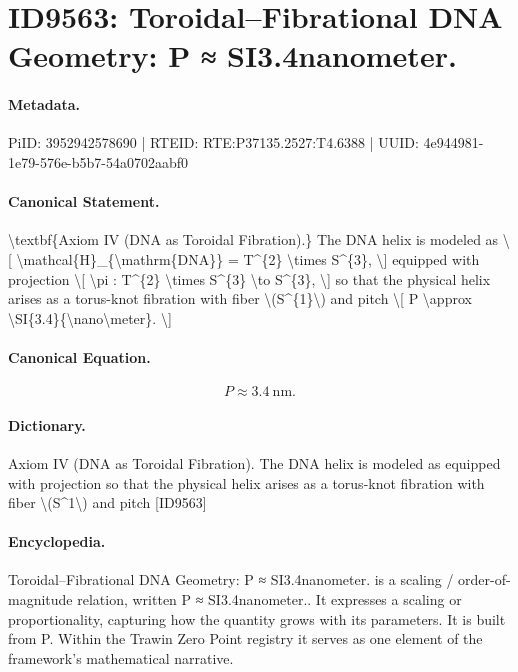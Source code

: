 \section*{ID9563: Toroidal–Fibrational DNA Geometry: P ≈ SI3.4nanometer.}
\paragraph{Metadata.}
PiID: 3952942578690 | RTEID: RTE:P37135.2527:T4.6388 | UUID: 4e944981-1e79-576e-b5b7-54a0702aabf0

\paragraph{Canonical Statement.}
\textbackslash{}textbf\{Axiom IV (DNA as Toroidal Fibration).\} The DNA helix is modeled as \textbackslash{}[ \textbackslash{}mathcal\{H\}\_\{\textbackslash{}mathrm\{DNA\}\} = T\textasciicircum{}\{2\} \textbackslash{}times S\textasciicircum{}\{3\}, \textbackslash{}] equipped with projection \textbackslash{}[ \textbackslash{}pi : T\textasciicircum{}\{2\} \textbackslash{}times S\textasciicircum{}\{3\} \textbackslash{}to S\textasciicircum{}\{3\}, \textbackslash{}] so that the physical helix arises as a torus-knot fibration with fiber \textbackslash{}(S\textasciicircum{}\{1\}\textbackslash{}) and pitch \textbackslash{}[ P \textbackslash{}approx \textbackslash{}SI\{3.4\}\{\textbackslash{}nano\textbackslash{}meter\}. \textbackslash{}]

\paragraph{Canonical Equation.}
\[
P \approx \SI{3.4}{\nano\meter}.
\]

\paragraph{Dictionary.}
Axiom IV (DNA as Toroidal Fibration). The DNA helix is modeled as equipped with projection so that the physical helix arises as a torus-knot fibration with fiber \textbackslash{}(S\textasciicircum{}1\textbackslash{}) and pitch [ID9563]

\paragraph{Encyclopedia.}
Toroidal–Fibrational DNA Geometry: P ≈ SI3.4nanometer. is a scaling / order-of-magnitude relation, written P ≈ SI3.4nanometer.. It expresses a scaling or proportionality, capturing how the quantity grows with its parameters. It is built from P. Within the Trawin Zero Point registry it serves as one element of the framework's mathematical narrative.
